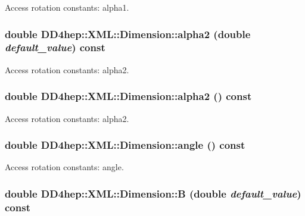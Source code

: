 Access rotation constants: alpha1. \hypertarget{struct_d_d4hep_1_1_x_m_l_1_1_dimension_a95e847f22f55049134d157eb4644fb49}{
\subsubsection[{alpha2}]{\setlength{\rightskip}{0pt plus 5cm}double DD4hep::XML::Dimension::alpha2 (double {\em default\_\-value}) const}}
\label{struct_d_d4hep_1_1_x_m_l_1_1_dimension_a95e847f22f55049134d157eb4644fb49}


Access rotation constants: alpha2. \hypertarget{struct_d_d4hep_1_1_x_m_l_1_1_dimension_ade02ecc4a40727303bf499637c1388cc}{
\subsubsection[{alpha2}]{\setlength{\rightskip}{0pt plus 5cm}double DD4hep::XML::Dimension::alpha2 () const}}
\label{struct_d_d4hep_1_1_x_m_l_1_1_dimension_ade02ecc4a40727303bf499637c1388cc}


Access rotation constants: alpha2. \hypertarget{struct_d_d4hep_1_1_x_m_l_1_1_dimension_a0918d748acba8a52e7e772501856a310}{
\subsubsection[{angle}]{\setlength{\rightskip}{0pt plus 5cm}double DD4hep::XML::Dimension::angle () const}}
\label{struct_d_d4hep_1_1_x_m_l_1_1_dimension_a0918d748acba8a52e7e772501856a310}


Access rotation constants: angle. \hypertarget{struct_d_d4hep_1_1_x_m_l_1_1_dimension_aa616ec66dd64445fc150bc74d1c93507}{
\subsubsection[{B}]{\setlength{\rightskip}{0pt plus 5cm}double DD4hep::XML::Dimension::B (double {\em default\_\-value}) const}}
\label{struct_d_d4hep_1_1_x_m_l_1_1_dimension_aa616ec66dd64445fc150bc74d1c93507}


